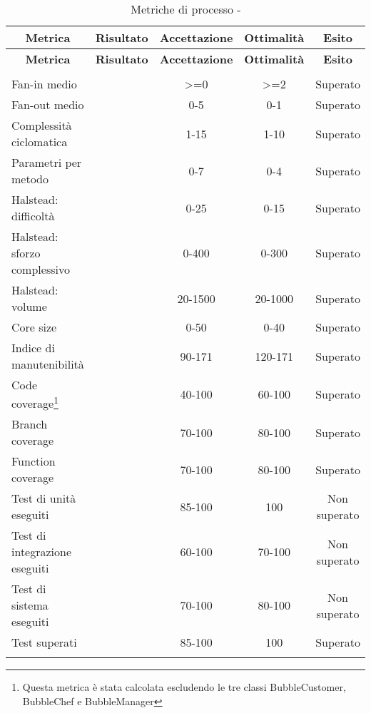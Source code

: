 \begin{longtable}{|m{5cm}|c|c|c|c|}
	\hline \multicolumn{1}{|c|}{\textbf{Metrica}} & \multicolumn{1}{c|}{\textbf{Risultato}} & \multicolumn{1}{c|}{\textbf{Accettazione}} & \multicolumn{1}{c|}{\textbf{Ottimalità}} & \multicolumn{1}{c|}{\textbf{Esito}}\\
	\hline 
	\endfirsthead
	
	\hline \multicolumn{1}{|c|}{\textbf{Metrica}} & \multicolumn{1}{c|}{\textbf{Risultato}} & \multicolumn{1}{c|}{\textbf{Accettazione}} & \multicolumn{1}{c|}{\textbf{Ottimalità}} & \multicolumn{1}{c|}{\textbf{Esito}}\\
	\hline 
	\endhead
	
	\hline \multicolumn{5}{|r|}{\ToBeContinued} \\ 
	\hline
	\endfoot
	
	\endlastfoot
	
	\hline Fan-in medio &  & >=0 & >=2 & Superato \\
	\hline Fan-out medio &  & 0-5 & 0-1 & Superato \\
	\hline Complessità ciclomatica &  & 1-15 & 1-10 & Superato \\
	\hline Parametri per metodo &  & 0-7 & 0-4 & Superato \\
	\hline Halstead: difficoltà &  & 0-25 & 0-15 & Superato \\
	\hline Halstead: sforzo complessivo &  & 0-400 & 0-300 & Superato\\
	\hline Halstead: volume &  & 20-1500 & 20-1000 & Superato \\
	\hline Core size &  & 0-50 & 0-40 & Superato \\
	\hline Indice di manutenibilità &  & 90-171 & 120-171 & Superato \\
	\hline Code coverage\footnote{\label{note1} Questa metrica è stata calcolata escludendo le tre classi BubbleCustomer, BubbleChef e BubbleManager} &  & 40-100 & 60-100 & Superato \\
	\hline Branch coverage\footnotemark[1] &  & 70-100 & 80-100 & Superato \\
	\hline Function coverage\footnotemark[1] &  & 70-100 & 80-100 & Superato \\
	\hline Test di unità eseguiti &  & 85-100 & 100 & Non superato \\
	\hline Test di integrazione eseguiti &  & 60-100 & 70-100 & Non superato \\
	\hline Test di sistema eseguiti &  & 70-100 & 80-100 & Non superato \\
	\hline Test superati &  & 85-100 & 100 & Superato \\
	\hline
	\caption{Metriche di processo - \RQ{}}
\end{longtable}

